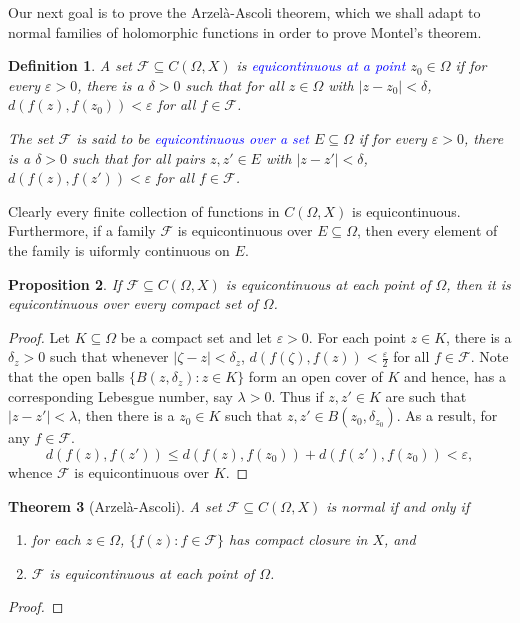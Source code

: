 \documentclass[11pt]{article}
\theoremstyle{thmstyle}
\newtheorem{theorem}{Theorem}[section]
\newtheorem{proposition}[theorem]{Proposition}
\theoremstyle{defstyle}
\newtheorem{definition}[theorem]{Definition}
\newcommand{\scrF}{\mathscr{F}}
\newcommand{\define}[1]{\textcolor{blue}{\textit{#1}}}
\renewcommand{\le}{\leqslant}
\begin{document}
Our next goal is to prove the Arzel\`a-Ascoli theorem, which we shall adapt to normal families of holomorphic functions in order to prove Montel's theorem. 

\begin{definition}
    A set $\scrF\subseteq C(\Omega, X)$ is \define{equicontinuous at a point} $z_0\in\Omega$ if for every $\varepsilon > 0$, there is a $\delta > 0$ such that for all $z\in\Omega$ with $|z - z_0| < \delta$, $d(f(z), f(z_0)) < \varepsilon$ for all $f\in\scrF$.

    The set $\scrF$ is said to be \define{equicontinuous over a set} $E\subseteq\Omega$ if for every $\varepsilon > 0$, there is a $\delta > 0$ such that for all pairs $z, z'\in E$ with $|z - z'| < \delta$, $d(f(z), f(z')) < \varepsilon$ for all $f\in\scrF$.
\end{definition}

Clearly every finite collection of functions in $C(\Omega, X)$ is equicontinuous. Furthermore, if a family $\scrF$ is equicontinuous over $E\subseteq\Omega$, then every element of the family is uiformly continuous on $E$.

\begin{proposition}
    If $\scrF\subseteq C(\Omega, X)$ is equicontinuous at each point of $\Omega$, then it is equicontinuous over every compact set of $\Omega$.
\end{proposition}
\begin{proof}
    Let $K\subseteq\Omega$ be a compact set and let $\varepsilon > 0$. For each point $z\in K$, there is a $\delta_z > 0$ such that whenever $|\zeta - z| < \delta_z$, $d(f(\zeta), f(z)) < \frac{\varepsilon}{2}$ for all $f\in\scrF$. Note that the open balls $\{B(z, \delta_z)\colon z\in K\}$ form an open cover of $K$ and hence, has a corresponding Lebesgue number, say $\lambda > 0$. Thus if $z, z'\in K$ are such that $|z - z'| < \lambda$, then there is a $z_0\in K$ such that $z, z'\in B(z_0, \delta_{z_0})$. As a result, for any $f\in\scrF$.
    \begin{equation*}
        d(f(z), f(z'))\le d(f(z), f(z_0)) + d(f(z'), f(z_0)) < \varepsilon,
    \end{equation*}
    whence $\scrF$ is equicontinuous over $K$.
\end{proof}

\begin{theorem}[Arzel\`a-Ascoli]
    A set $\scrF\subseteq C(\Omega, X)$ is normal if and only if 
    \begin{enumerate}[label=(\arabic*)]
        \item for each $z\in\Omega$, $\{f(z)\colon f\in\scrF\}$ has compact closure in $X$, and 
        \item $\scrF$ is equicontinuous at each point of $\Omega$.
    \end{enumerate}
\end{theorem}
\begin{proof}
\end{proof}
\end{document}

